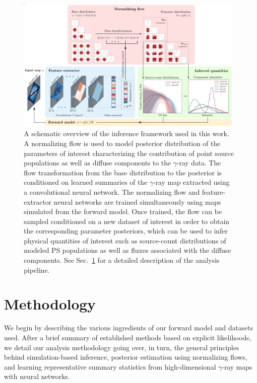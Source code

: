 \documentclass[prd,aps,10pt,nofootinbib,twocolumn,superscriptaddress,preprintnumbers,balancelastpage,longbibliography,floatfix]{revtex4-2}
\begin{document}
%
\begin{figure}
\centering
\includegraphics[width=0.99\textwidth]{plots/figure.pdf}
\caption{A schematic overview of the inference framework used in this work. A normalizing flow is used to model posterior distribution of the parameters of interest characterizing the contribution of point source populations as well as diffuse components to the $\gamma$-ray data. The flow transformation from the base distribution to the posterior is conditioned on learned summaries of the $\gamma$-ray map extracted using a convolutional neural network. The normalizing flow and feature-extractor neural networks are trained simultaneously using maps simulated from the forward model. Once trained, the flow can be sampled conditioned on a new dataset of interest in order to obtain the corresponding parameter posteriors, which can be used to infer physical quantities of interest such as source-count distributions of modeled PS populations as well as fluxes associated with the diffuse components. See Sec.~\ref{sec:analysis} for a detailed description of the analysis pipeline.}
\label{fig:figure}
\end{figure}
%

\section{Methodology}
\label{sec:analysis}

We begin by describing the various ingredients of our forward model and datasets used. After a brief summary of established methods based on explicit likelihoods, we detail our analysis methodology going over, in turn, the general principles behind simulation-based inference, posterior estimation using normalizing flows, and learning representative summary statistics from high-dimensional $\gamma$-ray maps with neural networks.
\end{document}
